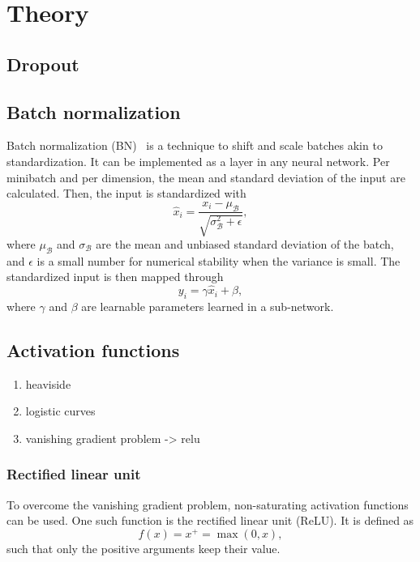 \chapter{Theory}

\section{Dropout}\label{sec:dropout}


\section{Batch normalization}\label{sec:bn}
Batch normalization (BN)~\cite{Ioffe2015} is a technique to shift and scale batches akin to standardization.
It can be implemented as a layer in any neural network.
Per minibatch and per dimension, the mean and standard deviation of the input are calculated.
Then, the input is standardized with
\begin{equation}
    \hat{x}_i = \frac{x_i - \mu_\mathcal{B}}{\sqrt{\sigma_\mathcal{B}^2 + \epsilon}},
\end{equation}
where $\mu_\mathcal{B}$ and $\sigma_\mathcal{B}$ are the mean and unbiased standard deviation of the batch, and $\epsilon$ is a small number for numerical stability when the variance is small.
The standardized input is then mapped through
\begin{equation}
    y_i = \gamma \hat{x}_i + \beta,
\end{equation}
where $\gamma$ and $\beta$ are learnable parameters learned in a sub-network.

\section{Activation functions}\label{sec:activations}

\begin{enumerate}
    \item heaviside
    \item logistic curves
    \item vanishing gradient problem -> relu
\end{enumerate}

\subsection{Rectified linear unit}\label{subsec:relu}
To overcome the vanishing gradient problem, non-saturating activation functions can be used.
One such function is the rectified linear unit (ReLU).
It is defined as
\begin{equation}
    f(x) = x^+ = \max(0, x),
\end{equation}
such that only the positive arguments keep their value.


